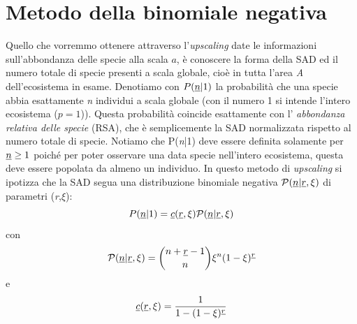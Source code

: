 \section{Metodo della binomiale negativa}
Quello che vorremmo ottenere attraverso l'\emph{upscaling} date le informazioni sull'abbondanza delle specie alla scala $a$, è conoscere la forma della SAD ed il numero totale di specie presenti a scala globale, cioè in tutta l'area \emph{A} dell'ecosistema in esame.
Denotiamo con $P(\emph{n}|1)$ la probabilità che una specie abbia esattamente \emph{n} individui a scala globale (con il numero 1 si intende l'intero ecosistema ($p=1$)). Questa probabilità coincide esattamente con l' \emph{abbondanza relativa delle specie} (RSA), che è semplicemente la SAD normalizzata rispetto al numero totale di specie.
Notiamo che P(\emph{n}|1) deve essere definita solamente per $\emph{n}\ge1$ poiché per poter osservare una data specie nell'intero ecosistema, questa deve essere popolata da almeno un individuo.\newline
In questo metodo di \emph{upscaling} si ipotizza che la SAD segua una distribuzione binomiale negativa $\mathcal{P}(\emph{n}|\emph{r},\xi)$ di parametri (\emph{r},$\xi$):
\\ 
\begin{equation}
 P(\emph{n}|1)=\emph{c}(\emph{r},\xi)\mathcal{P}(\emph{n}|\emph{r},\xi)
 \label{eq:NBfunctform}
\end{equation}
con 
\begin{equation}
    \mathcal{P}(\emph{n}|\emph{r},\xi)=\binom{n+\emph{r}-1}{n}\xi^n(1-\xi)^{\emph{r}}     
\end{equation}
e
\begin{equation}
     \emph{c}(\emph{r},\xi)=\frac{1}{1-(1-\xi)^{\emph{r}}}
\end{equation}
